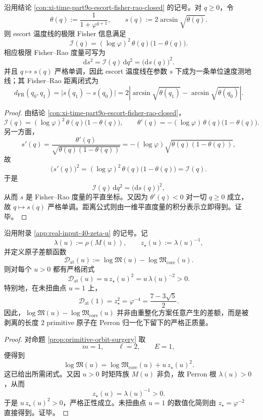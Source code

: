 \begin{theorem}\label{thm:conclusion-escort-fisher-rao-geodesic-reparametrization}
沿用结论 \ref{con:xi-time-part9o-escort-fisher-rao-closed} 的记号。对 \(q\ge 0\)，令
\[
\theta(q):=\frac{1}{1+\varphi^{q+1}},
\qquad
s(q):=2\arcsin\sqrt{\theta(q)}.
\]
则 escort 温度线的极限 Fisher 信息满足
\[
\boxed{\;
\mathcal I(q)=(\log\varphi)^2\,\theta(q)\bigl(1-\theta(q)\bigr).\;}
\]
相应极限 Fisher--Rao 度量可写为
\[
\boxed{\;
\mathrm ds^2=\mathcal I(q)\,\mathrm dq^2=\bigl(\mathrm d s(q)\bigr)^2.\;}
\]
并且 \(q\mapsto s(q)\) 严格单调，因此 escort 温度线在参数 \(s\) 下成为一条单位速度测地线；其 Fisher--Rao 距离闭式为
\[
\boxed{\;
d_{\mathrm{FR}}(q_0,q_1)
=
\bigl|s(q_1)-s(q_0)\bigr|
=
2\left|
\arcsin\sqrt{\theta(q_1)}-\arcsin\sqrt{\theta(q_0)}
\right|.\;}
\]
\end{theorem}
\begin{proof}
由结论 \ref{con:xi-time-part9o-escort-fisher-rao-closed}，
\[
\mathcal I(q)=(\log\varphi)^2\,\theta(q)\bigl(1-\theta(q)\bigr),
\qquad
\theta'(q)=-(\log\varphi)\,\theta(q)\bigl(1-\theta(q)\bigr).
\]
另一方面，
\[
s'(q)
=
\frac{\theta'(q)}{\sqrt{\theta(q)(1-\theta(q))}}
=
-(\log\varphi)\sqrt{\theta(q)(1-\theta(q))},
\]
故
\[
\bigl(s'(q)\bigr)^2
=
(\log\varphi)^2\,\theta(q)\bigl(1-\theta(q)\bigr)
=
\mathcal I(q).
\]
于是
\[
\mathcal I(q)\,\mathrm dq^2
=
\bigl(\mathrm d s(q)\bigr)^2,
\]
从而 \(s\) 是 Fisher--Rao 度量的平直坐标。又因为 \(\theta'(q)<0\) 对一切 \(q\ge 0\) 成立，故 \(q\mapsto s(q)\) 严格单调。距离公式则由一维平直度量的积分表示立即得到。证毕。
\end{proof}

\begin{theorem}\label{thm:conclusion-realinput40-abel-gap-positive-primitive-mass}
沿用附录 \ref{app:real-input-40-zeta-u} 的记号。记
\[
\lambda(u):=\rho(M(u)),\qquad
z_\star(u):=\lambda(u)^{-1},
\]
并定义原子差额函数
\[
\mathcal D_{\mathrm{at}}(u)
:=
\log\mathfrak{M}(u)-\log\mathfrak{M}_{\mathrm{core}}(u).
\]
则对每个 \(u>0\) 都有严格闭式
\[
\boxed{\;
\mathcal D_{\mathrm{at}}(u)=u\,z_\star(u)^2=u\,\lambda(u)^{-2}>0.\;}
\]
特别地，在未扭曲点 \(u=1\) 上，
\[
\mathcal D_{\mathrm{at}}(1)=z_\star^2=\varphi^{-4}=\frac{7-3\sqrt5}{2}.
\]
因此，\(\log\mathfrak{M}(u)-\log\mathfrak{M}_{\mathrm{core}}(u)\) 并非由重整化方案任意产生的差额，而是被剥离的长度 \(2\) primitive 原子在 Perron 归一化下留下的严格正质量。
\end{theorem}
\begin{proof}
对命题 \ref{prop:primitive-orbit-surgery} 取
\[
m=1,\qquad \ell=2,\qquad E=1,
\]
便得到
\[
\log\mathfrak{M}(u)=\log\mathfrak{M}_{\mathrm{core}}(u)+u\,z_\star(u)^2.
\]
这已给出所需闭式。又因 \(u>0\) 时矩阵族 \(M(u)\) 非负，故 Perron 根 \(\lambda(u)>0\)，从而
\[
z_\star(u)=\lambda(u)^{-1}>0.
\]
于是 \(u\,z_\star(u)^2>0\)，严格正性成立。未扭曲点 \(u=1\) 的数值化简则由 \(z_\star=\varphi^{-2}\) 直接得到。证毕。
\end{proof}

